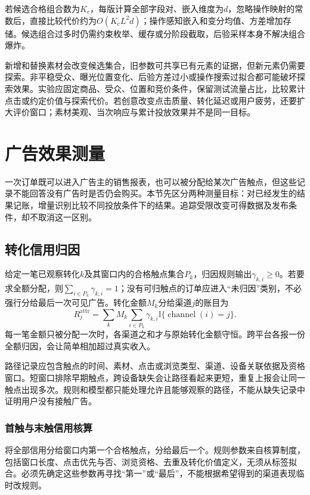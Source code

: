 若候选合格组合数为$K_c$，每版计算全部字段对、嵌入维度为$d$，忽略操作映射的常数后，直接比较代价约为$O(K_cL^2d)$；操作感知嵌入和变分均值、方差增加存储。候选组合过多时仍需约束枚举、缓存或分阶段截取，后验采样本身不解决组合爆炸。

新增和替换素材会改变候选集合，旧参数可共享已有元素的证据，但新元素仍需要探索。非平稳受众、曝光位置变化、后验方差过小或操作搜索过拟合都可能破坏探索效果。实验应固定商品、受众、位置和竞价条件，保留测试流量占比，比较累计点击或约定价值与探索代价。若创意改变点击质量、转化延迟或用户疲劳，还要扩大评价窗口；素材美观、当次响应与累计投放效果并不是同一目标。

\section{广告效果测量}
\label{sec:rs-advertising-measurement}

一次订单既可以进入广告主的销售报表，也可以被分配给某次广告触点，但这些记录不能回答没有广告时是否仍会购买。本节先区分两种测量目标：对已经发生的结果记账，增量识别比较不同投放条件下的结果。追踪受限改变可得数据及发布条件，却不取消这一区别。

\subsection{转化信用归因}
\label{sec:rs-advertising-attribution}

给定一笔已观察转化$k$及其窗口内的合格触点集合$P_k$，归因规则输出$\gamma_{k,i}\geq0$。若要求全额分配，则$\sum_{i\in P_k}\gamma_{k,i}=1$；没有可归触点的订单应进入“未归因”类别，不必强行分给最后一次可见广告。转化金额$M_k$分给渠道$j$的账目为
\[
  R_j^{\mathrm{attr}}
    =\sum_k M_k\sum_{i\in P_k}
       \gamma_{k,i}\mathbb I\{\operatorname{channel}(i)=j\}.
\]
每一笔金额只被分配一次时，各渠道之和才与原始转化金额守恒。跨平台各报一份全额归因，会让简单相加超过真实收入。

路径记录应包含触点的时间、素材、点击或浏览类型、渠道、设备关联依据及资格窗口。短窗口排除早期触点，跨设备缺失会让路径看起来更短，重复上报会让同一触点出现多次。规则和模型都只能处理允许且能够观察的路径，不能从缺失记录中证明用户没有接触广告。

\subsubsection{首触与末触信用核算}
\label{sec:rs-advertising-first-last}

将全部信用分给窗口内第一个合格触点，分给最后一个。规则参数来自核算制度，包括窗口长度、点击优先与否、浏览资格、去重及转化价值定义，无须从标签拟合。必须先确定这些参数再寻找“第一”或“最后”，不能根据希望得到的渠道表现临时改规则。


